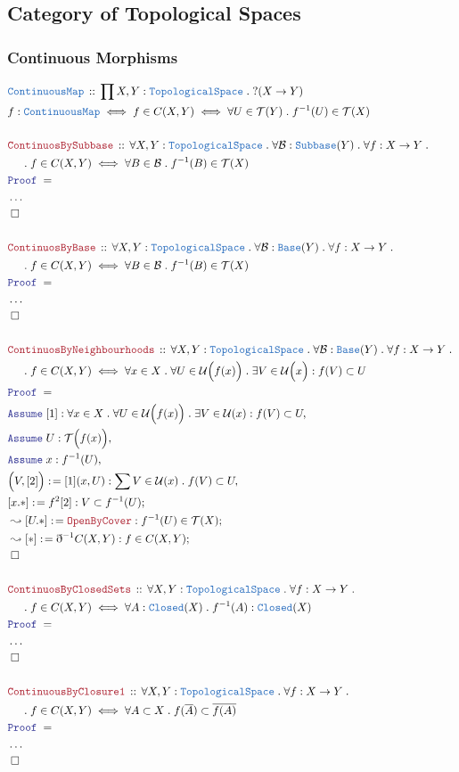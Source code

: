 \documentclass[12pt]{scrartcl}
\newcommand{\TYPE}[1]{\textcolor{NavyBlue}{\mathtt{#1}}}
\newcommand{\LOGIC}[1]{\textcolor{Blue}{\mathtt{#1}}}
\newcommand{\THM}[1]{\textcolor{Maroon}{\mathtt{#1}}}
\renewcommand{\.}{\; . \;}
\newcommand{\de}{: \kern 0.1pc =}
\newcommand{\Theorem}[2]{& \THM{#1} \, :: \, #2 \\ & \Proof = \\ }
\newcommand{\DeclareType}[2]{& \TYPE{#1} \, :: \, #2 \\}
\newcommand{\DefineNamedType}[4]{& #1 : \TYPE{#2} \iff #3 \iff #4 \\}
\newcommand{\NewLine}{\\ & \kern 1pc}
\newcommand{\Page}[1]{ \begin{align*} #1 \end{align*}   }
\newcommand{ \bd }{ \ByDef }
\newcommand{\NoProof}{ & \ldots \\ \EndProof}
\newcommand{\Say}[3]{& #1 \de #2 : #3, \\}
\newcommand{\Conclude}[3]{& #1 \de #2 : #3; \\}
\newcommand{\DeriveConclude}[3]{& \leadsto #1 \de #2 : #3 ; \\}
\newcommand{\Assume}[2]{& \LOGIC{Assume} \; #1 : #2, \\}
\newcommand{\QED}{\; \square}
\newcommand{\EndProof}{& \QED \\}
\newcommand{\ByDef}{\eth}
\newcommand{\Proof}{\LOGIC{Proof} \; }
\newcommand{\B}{\mathcal{B}}
\newcommand{\TS}{\TYPE{TopologicalSpace}}
\newcommand{\T}{\mathcal{T}}
\newcommand{\U}{\mathcal{U}}
\begin{document}
\subsection{Category of Topological Spaces}
\subsubsection{Continuous Morphisms}
\Page{
	\DeclareType{ContinuousMap}
	{
		\prod X,Y : \TS \.
		?( X \to Y)
	}
	\DefineNamedType{f}{ContinuousMap}{f \in C(X,Y)}
	{ \forall U \in \T(Y) \. f^{-1}(U) \in \T(X)  }
	\\
	\Theorem{ContinuosBySubbase}
	{
		\forall X,Y : \TS \.
		\forall \B : \TYPE{Subbase}(Y) \.
		\forall f : X \to Y \.
		\NewLine \. 
		f \in C(X,Y) \iff
		\forall B \in \B \.
		f^{-1}(B) \in \T(X)
	}
	\NoProof
	\\
	\Theorem{ContinuosByBase}
	{
		\forall X,Y : \TS \.
		\forall \B : \TYPE{Base}(Y) \.
		\forall f : X \to Y \.
		\NewLine \. 
		f \in C(X,Y) \iff
		\forall B \in \B \.
		f^{-1}(B) \in \T(X)
	}
	\NoProof
	\\
	\Theorem{ContinuosByNeighbourhoods}
	{
		\forall X,Y : \TS \.
		\forall \B : \TYPE{Base}(Y) \.
		\forall f : X \to Y \.
		\NewLine \. 
		f \in C(X,Y) \iff
		\forall x \in X \.
		\forall U \in \U\Big(f(x)\Big) \.
		\exists V \in \U\Big(x\Big) :
		f(V) \subset U
	}
	\Assume{[1]}
	{
		\forall x \in X \.
		\forall U \in \U\Big(f(x)\Big) \.
		\exists V \in \U( x ) :
		f(V) \subset U
	}
	\Assume{U}{\T\Big( f(x) \Big)}
	\Assume{x}{f^{-1}(U)}
	\Say{\Big(V,[2]\Big)}{[1](x,U) }{ \sum V \in \U(x) \. f(V) \subset U }
	\Conclude{[x.*]}{f^{2}[2]}{V \subset f^{-1}(U)}
	\DeriveConclude{[U.*]}{\THM{OpenByCover}}{ f^{-1}(U) \in \T(X) }
	\DeriveConclude{[*]}{\bd^{-1} C(X,Y)}{f \in C(X,Y)}
	\EndProof
	\\
	\Theorem{ContinuosByClosedSets}
	{
		\forall X,Y : \TS \.
		\forall f : X \to Y \.
		\NewLine \. 
		f \in C(X,Y) \iff
		\forall A : \TYPE{Closed}(X) \.
		f^{-1}(A) : \TYPE{Closed}(X)
	}
	\NoProof
	\\
	\Theorem{ContinuousByClosure1}
	{
		\forall X,Y : \TS \.
		\forall f : X \to Y \.
		\NewLine \.
		f \in C(X,Y) \iff
		\forall A \subset X \. 
		f(\overline{A}) \subset \overline{f(A)}
	}
	\NoProof
}
\end{document}
